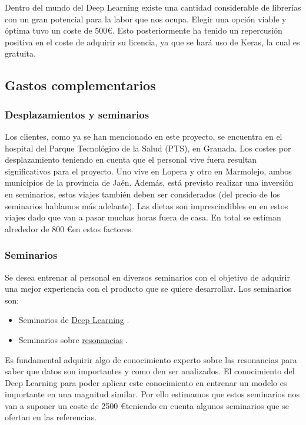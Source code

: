 Dentro del mundo del Deep Learning existe una cantidad considerable de librerías con un gran potencial para la labor que nos ocupa. Elegir una opción viable y óptima tuvo un coste de 500\euro. Esto posteriormente ha tenido un repercusión positiva en el coste de adquirir su licencia, ya que se hará uso de Keras, la cual es gratuita.

\subsection{Gastos complementarios}

\subsubsection{Desplazamientos y seminarios}

Los clientes, como ya se han mencionado en este proyecto, se encuentra en el hospital del Parque Tecnológico de la Salud (PTS), en Granada. Los costes por desplazamiento teniendo en cuenta que el personal vive fuera resultan significativos para el proyecto. Uno vive en Lopera y otro en Marmolejo, ambos municipios de la provincia de Jaén. Además, está previsto realizar una inversión en seminarios, estos viajes también deben ser considerados (del precio de los seminarios hablamos más adelante). Las dietas son imprescindibles en en estos viajes dado que van a pasar muchas horas fuera de casa. En total se estiman alrededor de 800 \euro en estos factores.  

\subsubsection{Seminarios}

Se desea entrenar al personal en diversos seminarios con el objetivo de adquirir una mejor experiencia con el producto que se quiere desarrollar. Los seminarios son:

\begin{itemize}
	\item Seminarios de \href{https://kschool.com/cursos/programa-deep-learning/}{Deep Learning} \cite{misc:learning}.
	\item Seminarios sobre \href{https://www.emagister.com/cursos-resonancia-magnetica-kwes-11454.htm}{resonancias} \cite{misc:resonancias}.
\end{itemize}

Es fundamental adquirir algo de conocimiento experto sobre las resonancias para saber que datos son importantes y como den ser analizados. El conocimiento del Deep Learning para poder aplicar este conocimiento en entrenar un modelo es importante en una magnitud similar. Por ello estimamos que estos seminarios nos van a suponer un coste de 2500 \euro teniendo en cuenta algunos seminarios que se ofertan en las referencias.

